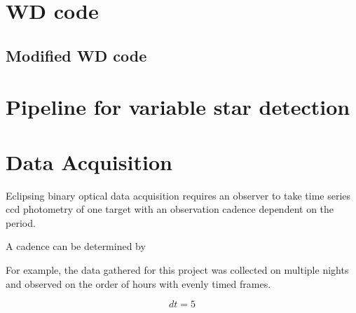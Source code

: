 \section{WD code}


\subsection{Modified WD code}


\section{Pipeline for variable star detection}



\section{Data Acquisition}
Eclipsing binary optical data acquisition requires an observer to take time series ccd photometry of one target with an observation cadence dependent on the period.

A cadence can be determined by 

For example, the data gathered for this project was collected on multiple nights and observed on the order of hours with evenly timed frames.


\begin{equation}
dt=5
\end{equation}
